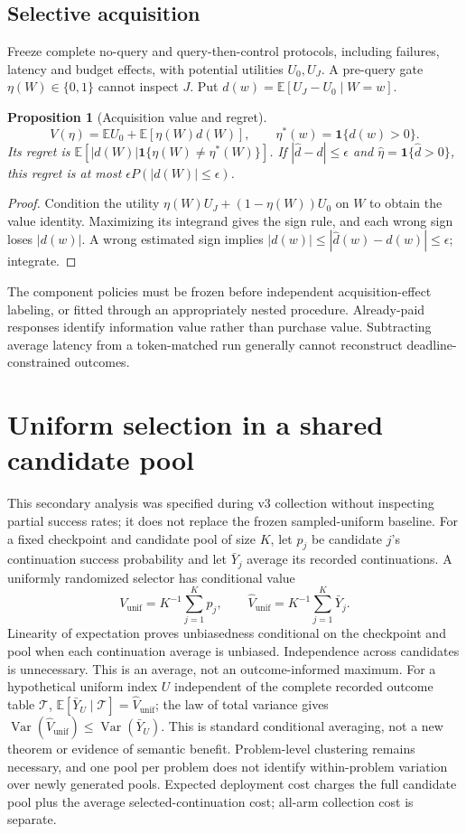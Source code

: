 \documentclass[11pt]{article}
\newtheorem{proposition}{Proposition}
\begin{document}
\subsection{Selective acquisition}
Freeze complete no-query and query-then-control protocols, including failures, latency and budget effects, with potential utilities $U_0,U_J$. A pre-query gate $\eta(W)\in\{0,1\}$ cannot inspect $J$. Put $d(w)=\mathbb E[U_J-U_0\mid W=w]$.
\begin{proposition}[Acquisition value and regret]
\[
V(\eta)=\mathbb E U_0+\mathbb E[\eta(W)d(W)],\qquad
\eta^*(w)=\mathbf1\{d(w)>0\}.
\]
Its regret is $\mathbb E[|d(W)|\mathbf1\{\eta(W)\ne\eta^*(W)\}]$. If $|\widehat d-d|\leq\epsilon$ and $\widehat\eta=\mathbf1\{\widehat d>0\}$, this regret is at most $\epsilon P(|d(W)|\leq\epsilon)$.
\end{proposition}
\begin{proof}
Condition the utility $\eta(W)U_J+(1-\eta(W))U_0$ on $W$ to obtain the value identity. Maximizing its integrand gives the sign rule, and each wrong sign loses $|d(w)|$. A wrong estimated sign implies $|d(w)|\leq|\widehat d(w)-d(w)|\leq\epsilon$; integrate.
\end{proof}
The component policies must be frozen before independent acquisition-effect labeling, or fitted through an appropriately nested procedure. Already-paid responses identify information value rather than purchase value. Subtracting average latency from a token-matched run generally cannot reconstruct deadline-constrained outcomes.

\section{Uniform selection in a shared candidate pool}
This secondary analysis was specified during v3 collection without inspecting partial success rates; it does not replace the frozen sampled-uniform baseline. For a fixed checkpoint and candidate pool of size $K$, let $p_j$ be candidate $j$'s continuation success probability and let $\bar Y_j$ average its recorded continuations. A uniformly randomized selector has conditional value
\[
V_{\mathrm{unif}}=K^{-1}\sum_{j=1}^{K}p_j,\qquad
\widehat V_{\mathrm{unif}}=K^{-1}\sum_{j=1}^{K}\bar Y_j.
\]
Linearity of expectation proves unbiasedness conditional on the checkpoint and pool when each continuation average is unbiased. Independence across candidates is unnecessary. This is an average, not an outcome-informed maximum. For a hypothetical uniform index $U$ independent of the complete recorded outcome table $\mathcal T$, $\mathbb E[\bar Y_U\mid\mathcal T]=\widehat V_{\mathrm{unif}}$; the law of total variance gives $\operatorname{Var}(\widehat V_{\mathrm{unif}})\leq\operatorname{Var}(\bar Y_U)$. This is standard conditional averaging, not a new theorem or evidence of semantic benefit. Problem-level clustering remains necessary, and one pool per problem does not identify within-problem variation over newly generated pools. Expected deployment cost charges the full candidate pool plus the average selected-continuation cost; all-arm collection cost is separate.
\end{document}
